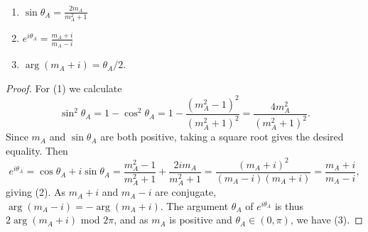 \documentclass[10pt,a4paper]{amsart}
\begin{document}
\begin{lem} \
\label{Lem:exp_Agol}
\begin{enumerate}
\item 
$\sin \theta_A = \frac{2m_A}{m_A^2 + 1}$
\item 
$e^{i \theta_A} = \frac{m_A + i}{m_A - i}$
\item 
$\arg (m_A + i) = \theta_A/2$.
\end{enumerate}
\end{lem}

\begin{proof}
For (1) we calculate
\[
\sin^2 \theta_A = 1 - \cos^2 \theta_A
= 1 - \frac{ \left( m_A^2-1 \right)^2}{ \left( m_A^2+1 \right)^2}
= \frac{4m_A^2}{\left( m_A^2 + 1 \right)^2}.
\]
Since $m_A$ and $\sin \theta_A$ are both positive, taking a square root gives the desired equality. Then
\[
e^{i \theta_A} = \cos \theta_A + i \sin \theta_A 
= \frac{m_A^2-1}{m_A^2 + 1} + \frac{2 i m_A }{m_A^2 + 1} 
= \frac{ \left( m_A + i \right)^2}{\left( m_A - i \right) \left( m_A + i \right)}
= \frac{m_A + i }{m_A - i},
\]
giving (2). As $m_A + i$ and $m_A - i$ are conjugate, $\arg(m_A - i) = -\arg(m_A + i)$. The argument $\theta_A$ of $e^{i\theta_A}$ is thus $2 \arg (m_A + i)$ mod $2\pi$, and as $m_A$ is positive and $\theta_A \in (0, \pi)$, we have (3). 
\end{proof}
\end{document}
